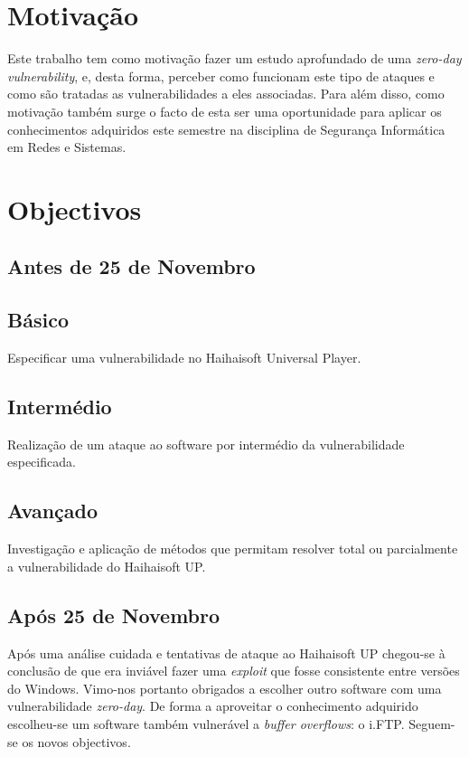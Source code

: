 \documentclass[a4paper]{article}
\begin{document}


\tableofcontents
\pagebreak

\section{Motivação}
Este trabalho tem como motivação fazer um estudo aprofundado de uma \textit{zero-day vulnerability}, e, desta forma, perceber como funcionam este tipo de ataques e como são tratadas as vulnerabilidades a eles associadas. Para além disso, como motivação também surge o facto de esta ser uma oportunidade para aplicar os conhecimentos adquiridos este semestre na disciplina de Segurança Informática em Redes e Sistemas.

\pagebreak
\section{Objectivos}
\label{sec:objectivos}

\subsection{Antes de 25 de Novembro}

\subsection*{Básico}
Especificar uma vulnerabilidade no Haihaisoft Universal Player.
\subsection*{Intermédio}
Realização de um ataque ao software por intermédio da vulnerabilidade especificada.
\subsection*{Avançado}
Investigação e aplicação de métodos que permitam resolver total ou parcialmente a vulnerabilidade do Haihaisoft UP.

\subsection{Após 25 de Novembro}
Após uma análise cuidada e tentativas de ataque ao Haihaisoft UP chegou-se à conclusão de que era inviável fazer uma \textit{exploit} que fosse consistente entre versões do Windows. Vimo-nos portanto obrigados a escolher outro software com uma vulnerabilidade \textit{zero-day}. De forma a aproveitar o conhecimento adquirido escolheu-se um software também vulnerável a \textit{buffer overflows}: o i.FTP. Seguem-se os novos objectivos.
\end{document}
